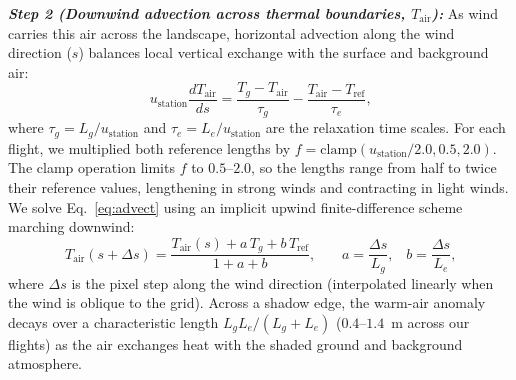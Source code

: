 \documentclass[12pt]{article}
\begin{document}
\vspace{0.6ex}
\noindent\textbf{\textit{Step 2 (Downwind advection across thermal boundaries, $T_{\textrm{air}}$):}}
As wind carries this air across the landscape, horizontal advection along the wind direction ($s$) balances local vertical exchange with the surface and background air:
\begin{equation} \label{eq:advect}
u_{\textrm{station}} \frac{d T_{\textrm{air}}}{d s} = \frac{T_g - T_{\textrm{air}}}{\tau_g} - \frac{T_{\textrm{air}} - T_{\textrm{ref}}}{\tau_e}\textrm{,}
\end{equation}
\noindent where $\tau_g = L_g / u_{\textrm{station}}$ and $\tau_e = L_e / u_{\textrm{station}}$ are the relaxation time scales. For each flight, we multiplied both reference lengths by $f = \textrm{clamp}(u_{\textrm{station}} / 2.0, 0.5, 2.0)$. The clamp operation limits $f$ to $0.5$--$2.0$, so the lengths range from half to twice their reference values, lengthening in strong winds and contracting in light winds. We solve Eq.~\ref{eq:advect} using an implicit upwind finite-difference scheme marching downwind:
\begin{equation} \label{eq:march}
T_{\textrm{air}}(s + \Delta s) = \frac{T_{\textrm{air}}(s) + a \, T_g + b \, T_{\textrm{ref}}}{1 + a + b}\textrm{,} \qquad a = \frac{\Delta s}{L_g}\textrm{,} \quad b = \frac{\Delta s}{L_e}\textrm{,}
\end{equation}
\noindent where $\Delta s$ is the pixel step along the wind direction (interpolated linearly when the wind is oblique to the grid). Across a shadow edge, the warm-air anomaly decays over a characteristic length $L_g L_e / (L_g + L_e)$ ($0.4\text{--}1.4$~m across our flights) as the air exchanges heat with the shaded ground and background atmosphere.
\end{document}
